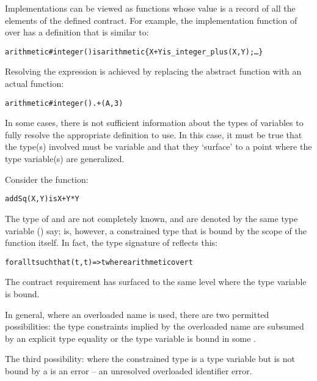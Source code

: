Implementations can be viewed as functions whose value is a record of all the elements of the defined contract. For example, the implementation function of  over  has a definition that is similar to:
\begin{alltt}
arithmetic\#integer() is arithmetic\{ X+Y is \_integer\_plus(X,Y); \ldots \}
\end{alltt}

Resolving the expression  is achieved by replacing the abstract function \q{(+)} with an actual function:
\begin{alltt}
arithmetic\#integer().+(A,3)
\end{alltt}

In some cases, there is not sufficient information about the types of variables to fully resolve the appropriate definition to use. In this case, it must be true that the type(s) involved must be variable and that they `surface' to a point where the type variable(s) are generalized.

Consider the function:
\begin{alltt}
addSq(X,Y) is X+Y*Y
\end{alltt}

The type of  and  are not completely known, and are denoted by the same type variable () say;  is, however, a constrained type that is bound by the scope of the  function itself. In fact, the type signature of  reflects this:
\begin{alltt}
for all t such that (t,t)=>t where arithmetic over t
\end{alltt}
The  contract requirement has surfaced to the same level where the type variable  is bound.

In general, where an overloaded name is used, there are two permitted possibilities: the type constraints implied by the overloaded name are subsumed by an explicit type equality or the type variable is bound in some .

\begin{aside}
The third possibility: where the constrained type is a type variable but is not bound by a  is an error -- an unresolved overloaded identifier error.
\end{aside}

